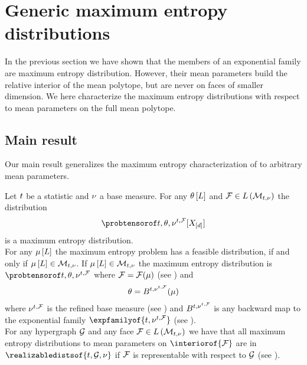 \section{Generic maximum entropy distributions}\label{sec:genMaxEnt}

In the previous section we have shown that the members of an exponential family are maximum entropy distribution.
However, their mean parameters build the relative interior of the mean polytope, but are never on faces of smaller dimension.
We here characterize the maximum entropy distributions with respect to mean parameters on the full mean polytope.

\subsection{Main result}

Our main result generalizes the maximum entropy characterization of  to arbitrary mean parameters.

\begin{theorem}
    \label{the:MAINgenMaxEntChar}
    Let $t$ be a statistic and $\nu$ a base measure.
    For any $\theta\left[L\right]$ and $\mathcal{F}\in L\left(\mathcal{M}_{t,\nu}\right)$ the distribution
    \begin{align*}
        \expdistofat{\sstat,\weightparam,\genfacemeasure}{\shortcatvariables}
    \end{align*}
    is a maximum entropy distribution. \\
    For any $\mu\left[L\right]$ the maximum entropy problem has a feasible distribution, if and only if $\mu\left[L\right]\in\mathcal{M}_{t,\nu}$.
    If $\mu\left[L\right]\in\mathcal{M}_{t,\nu}$ the maximum entropy distribution is $\expdistof{\sstat,\weightparam,\genfacemeasure}$ where $\mathcal{F}=\mathcal{F}(\mu)$ (see ) and
    \begin{align*}
        \theta
        = B^{t,\nu^{t,\mathcal{F}}}(\mu)
    \end{align*}
    where $\nu^{t,\mathcal{F}}$ is the refined base measure (see ) and $B^{t,\nu^{t,\mathcal{F}}}$ is any backward map to the exponential family $\expfamilyof{\sstat,\genfacemeasure}$ (see ). \\
    For any hypergraph $\mathcal{G}$ and any face $\mathcal{F}\in L\left(\mathcal{M}_{t,\nu}\right)$ we have that all maximum entropy distributions to mean parameters on $\interiorof{\facesymbol}$ are in $\realizabledistsof{\sstat,\graph,\basemeasure}$ if $\mathcal{F}$ is representable with respect to $\mathcal{G}$ (see ).
\end{theorem}

